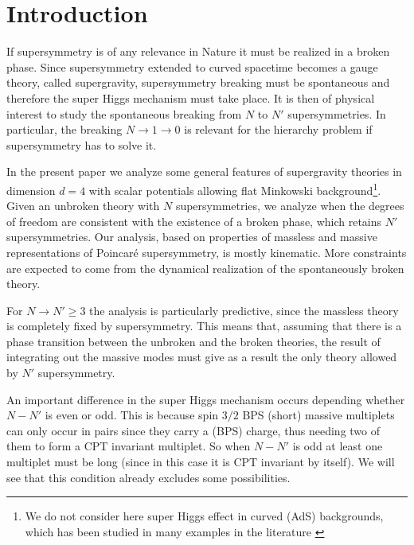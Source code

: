 \documentclass[a4paper,12pt]{article}
\begin{document}
\vfill\eject

\section{Introduction}

If supersymmetry is of any relevance in Nature it must be realized in a broken phase.
 Since supersymmetry extended to
 curved spacetime becomes a gauge theory, called supergravity, supersymmetry breaking must
  be spontaneous and therefore the
  super Higgs mechanism must take place. It is then of physical interest to study  the spontaneous
  breaking from  $N$ to $N'$
supersymmetries. In particular, the breaking $N\rightarrow 1\rightarrow 0$ is relevant for the hierarchy
 problem if supersymmetry has to solve it.



In the present paper we analyze some general features of
supergravity theories in dimension $d=4$ with scalar potentials \cite{dwn,war} allowing
 flat
Minkowski background\footnote{ We do not consider here super Higgs
effect in curved (AdS) backgrounds, which has been studied in many
examples in the literature  \cite{war,hw1}}.
 Given an unbroken theory with $N$ supersymmetries, we analyze when the degrees of freedom are consistent
  with the existence of a broken phase, which retains $N'$ supersymmetries.
Our analysis,  based on properties of massless and massive
representations \cite{fsz,st} of Poincar\'e supersymmetry,
 is mostly kinematic. More constraints are expected to come from the dynamical realization of the spontaneously
  broken theory.

For $N\rightarrow N'\geq 3$ \cite{ccfdfm} the analysis is particularly predictive, since the massless  theory
 is completely fixed by supersymmetry. This means that, assuming that there is a phase transition between the
  unbroken and the broken theories, the result of integrating out  the massive modes must give as a result the
   only theory allowed by  $N'$ supersymmetry.


An important difference in the super Higgs mechanism occurs depending whether $N-N'$ is even or odd. This is
 because spin $3/2$ BPS (short)  massive  multiplets can only occur in pairs since they carry a (BPS) charge,
  thus needing two of them to  form a  CPT invariant multiplet. So when $N-N'$ is odd at least one multiplet
  must be long (since in this case  it is  CPT invariant by itself). We will see that this condition already
  excludes some possibilities.
\end{document}
